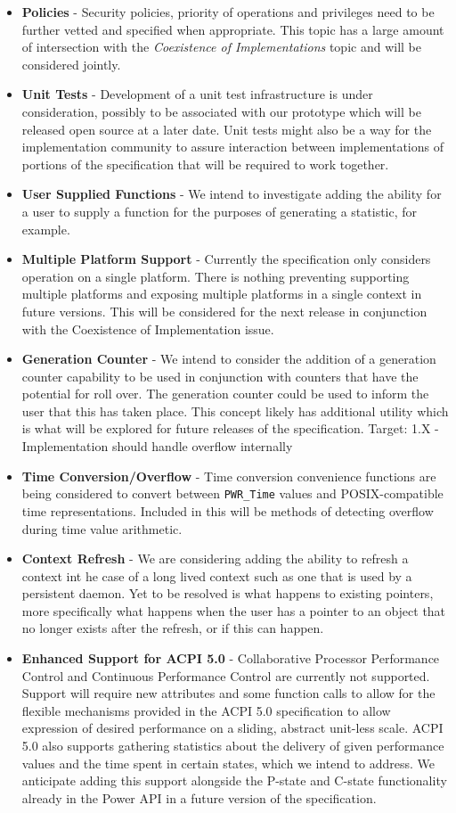 \documentclass[12pt]{report} %
\providecommand{\DIFaddbegin}{} %
\newcommand{\DIFaddincludegraphics}[2][]{{\color{blue}\fbox{\DIFOincludegraphics[#1]{#2}}}} %
\DeclareRobustCommand{\DIFaddbegin}{\DIFOaddbegin \let\includegraphics\DIFaddincludegraphics} %
\begin{document}
\begin{appendices}
\begin{itemize}[noitemsep,nolistsep]
\DIFaddbegin \item{\textbf{Policies} - Security policies, priority of operations and privileges need to be further vetted and specified when appropriate. This topic has a large amount of intersection with the \textit{Coexistence of Implementations} topic and will be considered jointly.
}
\item{\textbf{Unit Tests} - Development of a unit test infrastructure is under consideration, possibly to be associated with our prototype which will be released open source at a later date. Unit tests might also be a way for the implementation community to assure interaction between implementations of portions of the specification that will be required to work together.
}
\item{\textbf{User Supplied Functions} - We intend to investigate adding the ability for a user to supply a function for the purposes of generating a statistic, for example.
}
\item{\textbf{Multiple Platform Support} - Currently the specification only considers operation on a single platform. There is nothing preventing supporting multiple platforms and exposing multiple platforms in a single context in future versions. This will be considered for the next release in conjunction with the Coexistence of Implementation issue.
}
\item{\textbf{Generation Counter} - We intend to consider the addition of a generation counter capability to be used in conjunction with counters that have the potential for roll over. The generation counter could be used to inform the user that this has taken place. This concept likely has additional utility which is what will be explored for future releases of the specification. Target: 1.X - Implementation should handle overflow internally
}
\item{\textbf{Time Conversion/Overflow} - Time conversion convenience functions are being considered to convert between \texttt{PWR_Time} values and POSIX-compatible time representations. Included in this will be methods of detecting overflow during time value arithmetic.
}
\item{\textbf{Context Refresh} - We are considering adding the ability to refresh a context int he case of a long lived context such as one that is used by a persistent daemon. Yet to be resolved is what happens to existing pointers, more specifically what happens when the user has a pointer to an object that no longer exists after the refresh, or if this can happen. 
}
\item{\textbf{Enhanced Support for ACPI 5.0} - Collaborative Processor Performance Control and Continuous Performance Control are currently not supported. Support will require new attributes and some function calls to allow for the flexible mechanisms provided in the ACPI 5.0 specification to allow expression of desired performance on a sliding, abstract unit-less scale. ACPI 5.0 also supports gathering statistics about the delivery of given performance values and the time spent in certain states, which we intend to address. We anticipate adding this support alongside the P-state and C-state functionality already in the Power API in a future version of the specification. 
}
\end{itemize}
\end{appendices}
\end{document}
